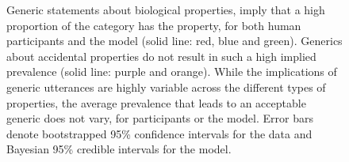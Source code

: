 \documentclass{pnastwo}
\begin{document}
\begin{article}
\begin{figure}
{    Generic statements about biological properties, imply that a high proportion of the category has the property, for both human participants and the model (solid line: red, blue and green). 
    Generics about accidental properties do not result in such a high implied prevalence (solid line: purple and orange).  
	While the implications of generic utterances are highly variable across the different types of properties, the average prevalence that leads to an acceptable generic does not vary, for participants or the model.
    Error bars denote bootstrapped 95\% confidence intervals for the data and Bayesian 95\% credible intervals for the model.
}
  \label{fig:exp2b}
\end{figure}





%


\end{article}
\end{document}
